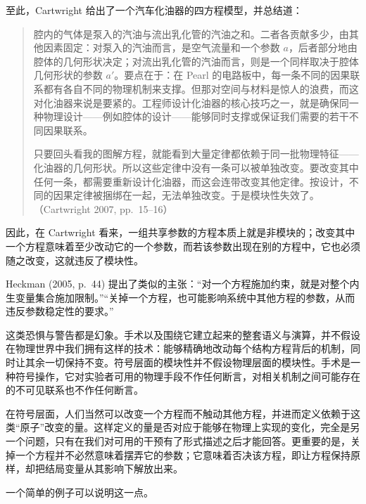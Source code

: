 至此，Cartwright 给出了一个汽车化油器的四方程模型，并总结道：

\begin{quote}\kaishu
腔内的气体是泵入的汽油与流出乳化管的汽油之和。二者各贡献多少，由其他因素固定：对泵入的汽油而言，是空气流量和一个参数 $a$，后者部分地由腔体的几何形状决定；对流出乳化管的汽油而言，则是一个同样取决于腔体几何形状的参数 $a'$。要点在于：在 Pearl 的电路板中，每一条不同的因果联系都有各自不同的物理机制来支撑。但那对空间与材料是惊人的浪费，而这对化油器来说是要紧的。工程师设计化油器的核心技巧之一，就是确保同一种物理设计——例如腔体的设计——能够同时支撑或保证我们需要的若干不同因果联系。

只要回头看我的图解方程，就能看到大量定律都依赖于同一批物理特征——化油器的几何形状。所以这些定律中没有一条可以被单独改变。要改变其中任何一条，都需要重新设计化油器，而这会连带改变其他定律。按设计，不同的因果定律被捆绑在一起，无法单独改变。于是模块性失效了。（Cartwright 2007, pp.~15--16）
\end{quote}

因此，在 Cartwright 看来，一组共享参数的方程本质上就是非模块的；改变其中一个方程意味着至少改动它的一个参数，而若该参数出现在别的方程中，它也必须随之改变，这就违反了模块性。

Heckman (2005, p.~44) 提出了类似的主张：“对一个方程施加约束，就是对整个内生变量集合施加限制。”“关掉一个方程，也可能影响系统中其他方程的参数，从而违反参数稳定性的要求。”

这类恐惧与警告都是幻象。手术以及围绕它建立起来的整套语义与演算，并不假设在物理世界中我们拥有这样的技术：能够精确地改动每个结构方程背后的机制，同时让其余一切保持不变。符号层面的模块性并不假设物理层面的模块性。手术是一种符号操作，它对实验者可用的物理手段不作任何断言，对相关机制之间可能存在的不可见联系也不作任何断言。

在符号层面，人们当然可以改变一个方程而不触动其他方程，并进而定义依赖于这类“原子”改变的量。这样定义的量是否对应于能够在物理上实现的变化，完全是另一个问题，只有在我们对可用的干预有了形式描述之后才能回答。更重要的是，关掉一个方程并不必然意味着摆弄它的参数；它意味着否决该方程，即让方程保持原样，却把结局变量从其影响下解放出来。

一个简单的例子可以说明这一点。

